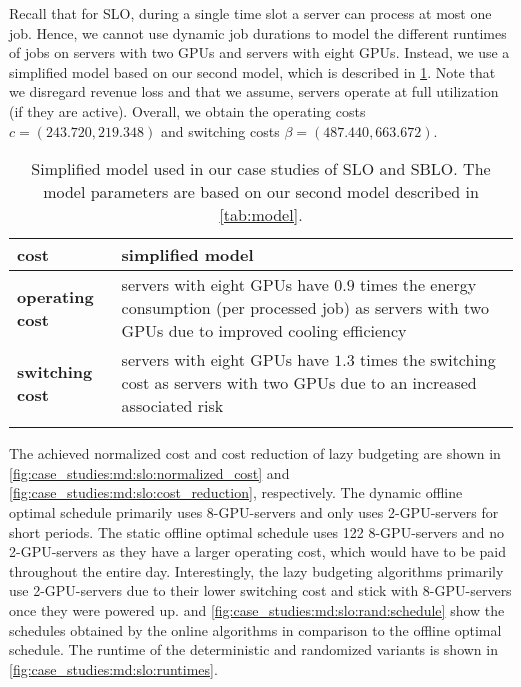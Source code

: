 Recall that for SLO, during a single time slot a server can process at most one job. Hence, we cannot use dynamic job durations to model the different runtimes of jobs on servers with two GPUs and servers with eight GPUs. Instead, we use a simplified model based on our second model, which is described in \cref{tab:simp_model}. Note that we disregard revenue loss and that we assume, servers operate at full utilization (if they are active). Overall, we obtain the operating costs $c = (243.720, 219.348)$ and switching costs $\beta = (487.440, 663.672)$.

\begin{table}
    \centering
    \begin{tabularx}{\textwidth}{>{\bfseries}l|X}
        cost & simplified model \\\hline
        operating cost & servers with eight GPUs have $0.9$ times the energy consumption (per processed job) as servers with two GPUs due to improved cooling efficiency \\
        switching cost & servers with eight GPUs have $1.3$ times the switching cost as servers with two GPUs due to an increased associated risk \\
    \caption{Simplified model used in our case studies of SLO and SBLO. The model parameters are based on our second model described in \cref{tab:model}.}
    \end{tabularx}
    \label{tab:simp_model}
\end{table}

The achieved normalized cost and cost reduction of lazy budgeting are shown in \cref{fig:case_studies:md:slo:normalized_cost} and \cref{fig:case_studies:md:slo:cost_reduction}, respectively. The dynamic offline optimal schedule primarily uses 8-GPU-servers and only uses 2-GPU-servers for short periods. The static offline optimal schedule uses 122 8-GPU-servers and no 2-GPU-servers as they have a larger operating cost, which would have to be paid throughout the entire day. Interestingly, the lazy budgeting algorithms primarily use 2-GPU-servers due to their lower switching cost and stick with 8-GPU-servers once they were powered up.  and \cref{fig:case_studies:md:slo:rand:schedule} show the schedules obtained by the online algorithms in comparison to the offline optimal schedule. The runtime of the deterministic and randomized variants is shown in \cref{fig:case_studies:md:slo:runtimes}.

